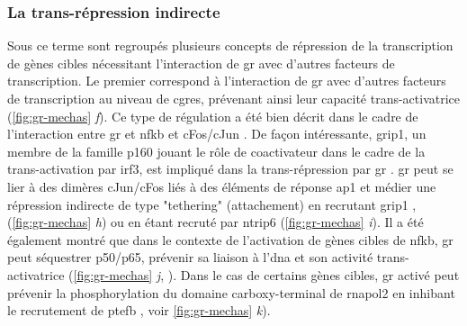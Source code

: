 \documentclass[../main.tex]{subfiles}
\begin{document}
\subsubsection{La trans-répression indirecte}
Sous ce terme sont regroupés plusieurs concepts de répression de la transcription de gènes cibles nécessitant l'interaction de \gls{gr} avec d'autres facteurs de transcription.
Le premier correspond à l'interaction de \gls{gr} avec d'autres facteurs de transcription au niveau de \glspl{cgre}, prévenant ainsi leur capacité trans-activatrice (\autoref{fig:gr-mechas} \textit{f}).
Ce type de régulation a été bien décrit dans le cadre de l'interaction entre \gls{gr} et \gls{nfkb} \citep{Ray1994} et cFos/cJun \citep{Pearce1993}.
De façon intéressante, \gls{grip1}, un membre de la famille p160 jouant le rôle de coactivateur dans le cadre de la trans-activation par \gls{irf3}, est impliqué dans la trans-répression par \gls{gr} \citep{Reily2006}.
\gls{gr} peut se lier à des dimères cJun/cFos liés à des éléments de réponse \gls{ap1} et médier une répression indirecte de type "tethering" (attachement) en recrutant \gls{grip1} \citep{Rogatsky2002}, (\autoref{fig:gr-mechas} \textit{h}) ou en étant recruté par \gls{ntrip6} (\autoref{fig:gr-mechas} \textit{i}).
Il a été également montré que dans le contexte de l'activation de gènes cibles de \gls{nfkb}, \gls{gr} peut séquestrer p50/p65, prévenir sa liaison à l'\gls{dna} et son activité trans-activatrice (\autoref{fig:gr-mechas} \textit{j}, \citet{Mukaida1994,DeBosscher2003}).
Dans le cas de certains gènes cibles, \gls{gr} activé peut prévenir la phosphorylation du domaine carboxy-terminal de \gls{rnapol2} \citep{Nissen2000} en inhibant le recrutement de \gls{ptefb} \citep{Luecke2005}, voir \autoref{fig:gr-mechas} \textit{k}).
\end{document}
